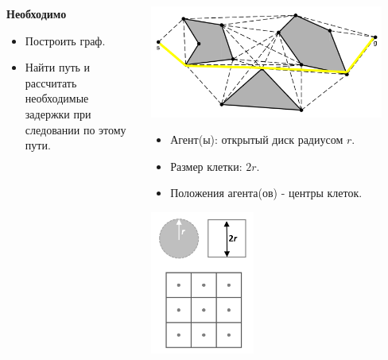 \documentclass[default]{beamer}
\begin{document}
\begin{frame}
\begin{columns}
\begin{column}{0.6\textwidth}
				\textbf{Необходимо}
				\begin{itemize}
					\item Построить граф.
					\item Найти путь и рассчитать необходимые задержки при следовании по этому пути.
				\end{itemize}
			\end{column}
			\begin{column}{0.4\textwidth}
				\includegraphics[width=0.9\textwidth]{pathobst.png}
				\begin{itemize}
					\item Агент(ы): открытый диск радиусом $r$.
					\item Размер клетки: $2r$.
					\item Положения агента(ов) - центры клеток.
				\end{itemize}
				\centering
				\includegraphics[width=0.4\textwidth]{pathdetails.png}
			\end{column}
		\end{columns}
	\end{frame}
\end{document}
